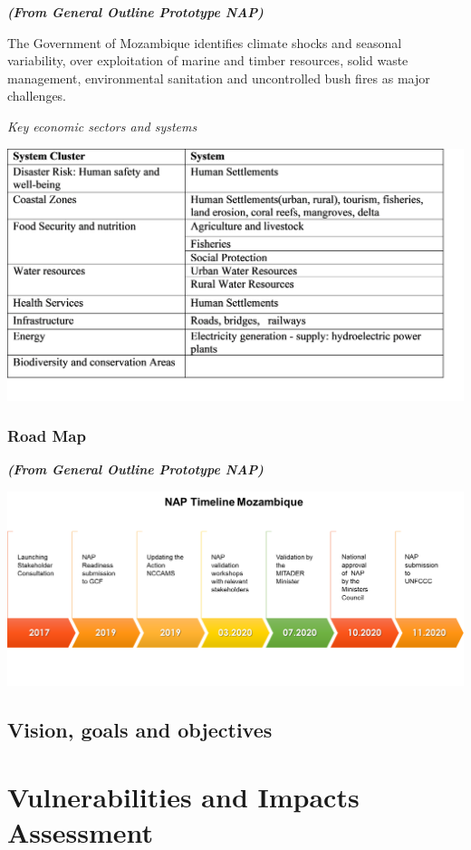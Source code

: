 \documentclass[
]{book}
\begin{document}
\textbf{\emph{(From General Outline Prototype NAP)}}

The Government of Mozambique identifies climate shocks and seasonal variability, over exploitation of marine and timber resources, solid waste management, environmental sanitation and uncontrolled bush fires as major challenges.

\emph{Key economic sectors and systems}

\includegraphics{Systems.png}

\hypertarget{road-map}{%
\subsection{Road Map}\label{road-map}}

\textbf{\emph{(From General Outline Prototype NAP)}}

\includegraphics{Roadmap.png}

\hypertarget{vision-goals-and-objectives}{%
\section{Vision, goals and objectives}\label{vision-goals-and-objectives}}

\hypertarget{vulnerabilities-and-impacts-assessment}{%
\chapter{Vulnerabilities and Impacts Assessment}\label{vulnerabilities-and-impacts-assessment}}
\end{document}
